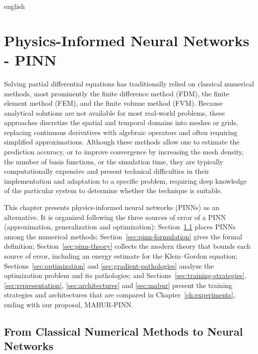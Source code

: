 
\begin{hyphenrules}{english}

\chapter{Physics-Informed Neural Networks - PINN}\label{ch:pinns}

Solving partial differential equations has traditionally relied on classical numerical methods, most
prominently the finite difference method (FDM), the finite element method (FEM), and the finite volume
method (FVM). Because analytical solutions are not available for most real-world problems, these
approaches discretize the spatial and temporal domains into meshes or grids, replacing continuous
derivatives with algebraic operators and often requiring simplified approximations. Although these
methods allow one to estimate the prediction accuracy, or to improve convergence by increasing the
mesh density, the number of basis functions, or the simulation time, they are typically computationally
expensive and present technical difficulties in their implementation and adaptation to a specific
problem, requiring deep knowledge of the particular system to determine whether the technique is
suitable.

This chapter presents physics-informed neural networks (PINNs) as an alternative. It is organized
following the three sources of error of a PINN (approximation, generalization and optimization):
Section~\ref{sec:pinn-background} places PINNs among the numerical methods; Section~\ref{sec:pinn-formulation}
gives the formal definition; Section~\ref{sec:pinn-theory} collects the modern theory that bounds each source
of error, including an energy estimate for the Klein--Gordon equation; Sections~\ref{sec:optimization} and \ref{sec:gradient-pathologies}
analyze the optimization problem and its pathologies; and
Sections~\ref{sec:training-strategies}, \ref{sec:representation}, \ref{sec:architectures} and \ref{sec:mabur} present the training
strategies and architectures that are compared in Chapter~\ref{ch:experiments}, ending with our proposal,
MABUR-PINN.

\section{From Classical Numerical Methods to Neural Networks}\label{sec:pinn-background}


\end{hyphenrules}
